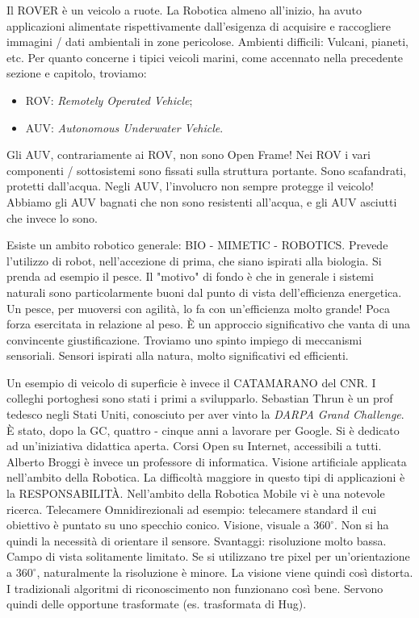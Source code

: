 Il ROVER è un veicolo a ruote. La Robotica almeno all'inizio, ha avuto applicazioni alimentate rispettivamente dall'esigenza di acquisire e raccogliere immagini / dati ambientali in zone pericolose. Ambienti difficili: Vulcani, pianeti, etc. Per quanto concerne i tipici veicoli marini, come accennato nella precedente sezione e capitolo, troviamo:

\begin{itemize}

\item{ROV}: \emph{Remotely Operated Vehicle};
\item{AUV}: \emph{Autonomous Underwater Vehicle}.
\end{itemize}

Gli AUV, contrariamente ai ROV, non sono Open Frame! Nei ROV i vari componenti / sottosistemi sono fissati sulla struttura portante. Sono scafandrati, protetti dall'acqua. Negli AUV, l'involucro non sempre protegge il veicolo! Abbiamo gli AUV bagnati che non sono resistenti all'acqua, e gli AUV asciutti che invece lo sono.

Esiste un ambito robotico generale: BIO - MIMETIC - ROBOTICS. Prevede l'utilizzo di robot, nell'accezione di prima, che siano ispirati alla biologia. Si prenda ad esempio il pesce. Il "motivo" di fondo è che in generale i sistemi naturali sono particolarmente buoni dal punto di vista dell'efficienza energetica. Un pesce, per muoversi con agilità, lo fa con un'efficienza molto grande! Poca forza esercitata in relazione al peso. \`E un approccio significativo che vanta di una convincente giustificazione. Troviamo uno spinto impiego di meccanismi sensoriali. Sensori ispirati alla natura, molto significativi ed efficienti.

Un esempio di veicolo di superficie è invece il CATAMARANO del CNR. I colleghi portoghesi sono stati i primi a svilupparlo. Sebastian Thrun è un prof tedesco negli Stati Uniti, conosciuto per aver vinto la \emph{DARPA Grand Challenge}. \`E stato, dopo la  GC, quattro - cinque anni a lavorare per Google. Si è dedicato ad un'iniziativa didattica aperta. Corsi Open su Internet, accessibili a tutti. Alberto Broggi è invece un professore di informatica. Visione artificiale applicata nell'ambito della Robotica. La difficoltà maggiore in questo tipi di applicazioni è la RESPONSABILIT\`A. Nell'ambito della Robotica Mobile vi è una notevole ricerca. Telecamere Omnidirezionali ad esempio: telecamere standard il cui obiettivo è puntato su uno specchio conico. Visione, visuale a $360^{\circ}$. Non si ha quindi la necessità di orientare il sensore. Svantaggi: risoluzione molto bassa. Campo di vista solitamente limitato. Se si utilizzano tre pixel per un'orientazione a $360^{\circ}$, naturalmente la risoluzione è minore. La visione viene quindi così distorta. I tradizionali algoritmi di riconoscimento non funzionano così bene. Servono quindi delle opportune trasformate (es. trasformata di Hug).

